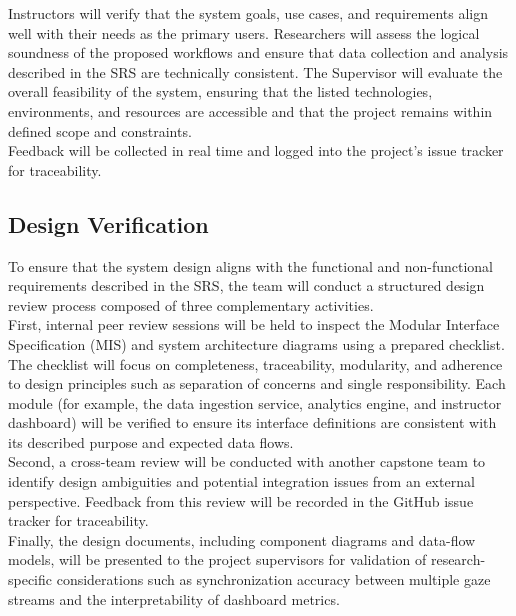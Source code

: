 \documentclass[12pt, titlepage]{article}
\begin{document}
Instructors will verify that the system goals, use cases, and requirements align well with their needs as the primary users. Researchers will assess the logical soundness of the proposed workflows and ensure that data collection and analysis described in the SRS are technically consistent. The Supervisor will evaluate the overall feasibility of the system, ensuring that the listed technologies, environments, and resources are accessible and that the project remains within defined scope and constraints.\\

Feedback will be collected in real time and logged into the project’s issue tracker for traceability.\\


\subsection{Design Verification}

To ensure that the system design aligns with the functional and non-functional requirements described in the SRS, the team will conduct a structured design review process composed of three complementary activities.\\

First, internal peer review sessions will be held to inspect the Modular Interface Specification (MIS) and system architecture diagrams using a prepared checklist. The checklist will focus on completeness, traceability, modularity, and adherence to design principles such as separation of concerns and single responsibility. Each module (for example, the data ingestion service, analytics engine, and instructor dashboard) will be verified to ensure its interface definitions are consistent with its described purpose and expected data flows.\\

Second, a cross-team review will be conducted with another capstone team to identify design ambiguities and potential integration issues from an external perspective. Feedback from this review will be recorded in the GitHub issue tracker for traceability.\\

Finally, the design documents, including component diagrams and data-flow models, will be presented to the project supervisors for validation of research-specific considerations such as synchronization accuracy between multiple gaze streams and the interpretability of dashboard metrics.\\
\end{document}
